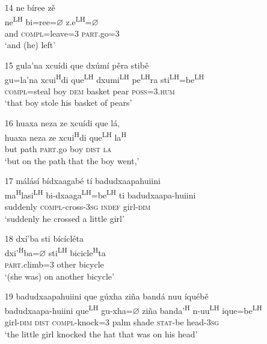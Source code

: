 \begin{itemize}
 
 \item[14]
\glll ne b\'{i}ree z\v{e}\\
ne\textsuperscript{LH} bi=ree={$\varnothing$} z.e\textsuperscript{LH}={$\varnothing$} \\
and \textsc{compl}=leave=\textsc{3} \textsc{part}.go=\textsc{3} \\
\glt `and (he) left'


\item[15]
\glll gula'na xcu\'{i}di que dx\'{u}m\'{i} p\v{e}ra stib\v{e} \\
gu=la'na xcui\textsuperscript{H}di que\textsuperscript{LH} dxumi\textsuperscript{LH} pe\textsuperscript{LH}ra sti\textsuperscript{LH}=be\textsuperscript{LH}  \\
\textsc{compl}=steal boy \textsc{dem} basket pear \textsc{poss}=\textsc{3.hum} \\
\glt `that boy stole his basket of pears'


\item[16]
\glll huaxa neza ze xcu\'{i}di que l\'{a}, \\
huaxa neza ze xcui\textsuperscript{H}di que\textsuperscript{LH} la\textsuperscript{H} \\
but path \textsc{part}.go boy \textsc{dist} \textsc{la} \\
\glt `but on the path that the boy went,'
\glend


\item[17]
\glll m\'{a}l\'{a}s\'{i} b\'{i}dxaagab\'{e} t\'{i} badudxaapahuiini  \\
ma\textsuperscript{H}lasi\textsuperscript{LH} bi-dxaaga\textsuperscript{LH}=be\textsuperscript{LH} ti badudxaapa-huiini  \\
suddenly \textsc{compl}-cross-3\textsc{sg} \textsc{indef} girl-\textsc{dim} \\
\glt `suddenly he crossed a little girl'
\glend


\item[18]
\glll dx\'{i}'ba sti b\'{i}c\'{i}cl\'{e}ta \\
dxi'\textsuperscript{H}ba=$\varnothing$ sti\textsuperscript{LH} bicicle\textsuperscript{H}ta \\
\textsc{part}.climb=\textsc{3} other bicycle \\
\glt `(she was) on another bicycle'


\item[19]
\glll badudxaapahuiini que g\'{u}xha zi\~{n}a band\'{a} nuu \'{i}qu\'{e}b\v{e} \\
badudxaapa-huiini que\textsuperscript{LH} gu-xha=$\varnothing$ zi\~{n}a banda'\textsuperscript{H} n-uu\textsuperscript{LH} ique=be\textsuperscript{LH} \\
girl-\textsc{dim} \textsc{dist} \textsc{compl}-knock=\textsc{3} palm shade \textsc{stat}-be head-3\textsc{sg} \\
\glt `the little girl knocked the hat that was on his head' 



\end{itemize}
